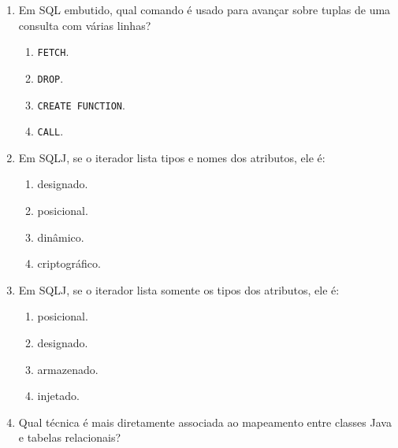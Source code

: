 \documentclass[12pt,a4paper]{article}
\begin{document}
\begin{enumerate}[resume,label=\textbf{Q\arabic*.}]
\begin{enumerate}[label=\alph*)]
    \item criar conexão, criar comando, executar \texttt{executeQuery}, processar \texttt{ResultSet}.
    \item criar \texttt{ResultSet}, executar \texttt{DROP}, abrir conexão no final.
    \item fechar conexão, processar resultado, executar consulta.
    \item executar \texttt{DELETE}, usar \texttt{GROUP BY}, criar driver.
\end{enumerate}

\item Em SQL embutido, qual comando é usado para avançar sobre tuplas de uma consulta com várias linhas?

\begin{enumerate}[label=\alph*)]
    \item \texttt{FETCH}.
    \item \texttt{DROP}.
    \item \texttt{CREATE FUNCTION}.
    \item \texttt{CALL}.
\end{enumerate}

\item Em SQLJ, se o iterador lista tipos e nomes dos atributos, ele é:

\begin{enumerate}[label=\alph*)]
    \item designado.
    \item posicional.
    \item dinâmico.
    \item criptográfico.
\end{enumerate}

\item Em SQLJ, se o iterador lista somente os tipos dos atributos, ele é:

\begin{enumerate}[label=\alph*)]
    \item posicional.
    \item designado.
    \item armazenado.
    \item injetado.
\end{enumerate}

\item Qual técnica é mais diretamente associada ao mapeamento entre classes Java e tabelas relacionais?


\end{enumerate}
\end{document}
